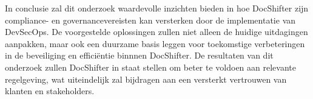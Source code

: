 \documentclass{hogent-article}
\begin{document}
    In conclusie zal dit onderzoek waardevolle inzichten bieden in hoe DocShifter zijn compliance- en governancevereisten kan versterken door de implementatie van DevSecOps. De voorgestelde oplossingen zullen niet alleen de huidige uitdagingen aanpakken, maar ook een duurzame basis leggen voor toekomstige verbeteringen in de beveiliging en efficiëntie binnnen DocShifter. De resultaten van dit onderzoek zullen DocShifter in staat stellen om beter te voldoen aan relevante regelgeving, wat uiteindelijk zal bijdragen aan een versterkt vertrouwen van klanten en stakeholders.
    
    
         
    
    \printbibliography[heading=bibintoc]
    
\end{document}
